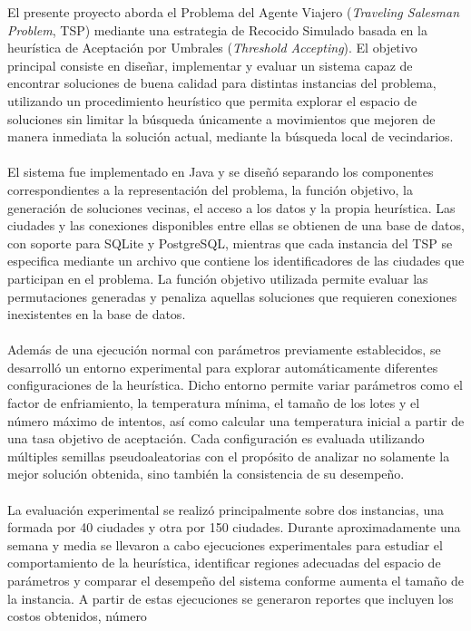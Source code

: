 \documentclass[12pt]{article}
\begin{document}
El presente proyecto aborda el Problema del Agente Viajero
(\textit{Traveling Salesman Problem}, TSP) mediante una estrategia de
Recocido Simulado basada en la heurística de Aceptación por Umbrales
(\textit{Threshold Accepting}). El objetivo principal consiste en diseñar,
implementar y evaluar un sistema capaz de encontrar soluciones de buena
calidad para distintas instancias del problema, utilizando un procedimiento
heurístico que permita explorar el espacio de soluciones sin limitar la
búsqueda únicamente a movimientos que mejoren de manera inmediata la
solución actual, mediante la búsqueda local de vecindarios.
\\\\
El sistema fue implementado en Java y se diseñó separando los componentes
correspondientes a la representación del problema, la función objetivo, la
generación de soluciones vecinas, el acceso a los datos y la propia
heurística. Las ciudades y las conexiones disponibles entre ellas se
obtienen de una base de datos, con soporte para SQLite y PostgreSQL,
mientras que cada instancia del TSP se especifica mediante un archivo que
contiene los identificadores de las ciudades que participan en el problema.
La función objetivo utilizada permite evaluar las permutaciones generadas y
penaliza aquellas soluciones que requieren conexiones inexistentes en la
base de datos.
\\\\
Además de una ejecución normal con parámetros previamente establecidos, se
desarrolló un entorno experimental para explorar automáticamente diferentes
configuraciones de la heurística. Dicho entorno permite variar parámetros
como el factor de enfriamiento, la temperatura mínima, el tamaño de los
lotes y el número máximo de intentos, así como calcular una temperatura
inicial a partir de una tasa objetivo de aceptación. Cada configuración es
evaluada utilizando múltiples semillas pseudoaleatorias con el propósito de
analizar no solamente la mejor solución obtenida, sino también la
consistencia de su desempeño.
\\\\
La evaluación experimental se realizó principalmente sobre dos instancias,
una formada por 40 ciudades y otra por 150 ciudades. Durante
aproximadamente una semana y media se llevaron a cabo ejecuciones
experimentales para estudiar el comportamiento de la heurística, identificar
regiones adecuadas del espacio de parámetros y comparar el desempeño del
sistema conforme aumenta el tamaño de la instancia. A partir de estas
ejecuciones se generaron reportes que incluyen los costos obtenidos, número
\end{document}
